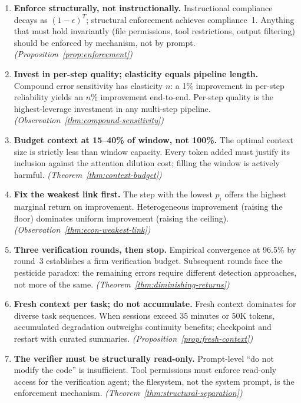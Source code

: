 \documentclass[11pt, a4paper]{googledeepmind}
\begin{document}
\begin{enumerate}[label=\textbf{\arabic*.}, nosep]
    \item \textbf{Enforce structurally, not instructionally.} Instructional compliance decays as $(1-\epsilon)^T$; structural enforcement achieves compliance~1. Anything that must hold invariantly (file permissions, tool restrictions, output filtering) should be enforced by mechanism, not by prompt. \emph{(Proposition~\ref{prop:enforcement})}

    \item \textbf{Invest in per-step quality; elasticity equals pipeline length.} Compound error sensitivity has elasticity $n$: a 1\% improvement in per-step reliability yields an $n$\% improvement end-to-end. Per-step quality is the highest-leverage investment in any multi-step pipeline. \emph{(Observation~\ref{thm:compound-sensitivity})}

    \item \textbf{Budget context at 15--40\% of window, not 100\%.} The optimal context size is strictly less than window capacity. Every token added must justify its inclusion against the attention dilution cost; filling the window is actively harmful. \emph{(Theorem~\ref{thm:context-budget})}

    \item \textbf{Fix the weakest link first.} The step with the lowest $p_i$ offers the highest marginal return on improvement. Heterogeneous improvement (raising the floor) dominates uniform improvement (raising the ceiling). \emph{(Observation~\ref{thm:econ-weakest-link})}

    \item \textbf{Three verification rounds, then stop.} Empirical convergence at 96.5\% by round~3 establishes a firm verification budget. Subsequent rounds face the pesticide paradox: the remaining errors require different detection approaches, not more of the same. \emph{(Theorem~\ref{thm:diminishing-returns})}

    \item \textbf{Fresh context per task; do not accumulate.} Fresh context dominates for diverse task sequences. When sessions exceed 35 minutes or 50K tokens, accumulated degradation outweighs continuity benefits; checkpoint and restart with curated summaries. \emph{(Proposition~\ref{prop:fresh-context})}

    \item \textbf{The verifier must be structurally read-only.} Prompt-level ``do not modify the code'' is insufficient. Tool permissions must enforce read-only access for the verification agent; the filesystem, not the system prompt, is the enforcement mechanism. \emph{(Theorem~\ref{thm:structural-separation})}


\end{enumerate}
\end{document}
